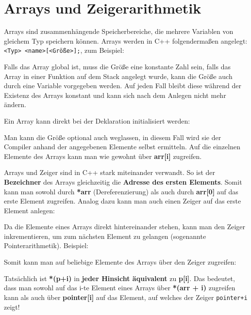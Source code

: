 \section{\ExercisePrefixMemory Arrays und Zeigerarithmetik}
Arrays sind zusammenhängende Speicherbereiche, die mehrere Variablen von gleichem Typ speichern können.
Arrays werden in C++ folgendermaßen angelegt: \lstinline{<Typ> <name>[<Größe>];}, zum Beispiel:



Falls das Array global ist, muss die Größe eine konstante Zahl sein, falls das Array in einer Funktion auf dem Stack angelegt wurde, kann die Größe auch durch eine Variable vorgegeben werden.
Auf jeden Fall bleibt diese während der Existenz des Arrays konstant und kann sich nach dem Anlegen nicht mehr ändern.

Ein Array kann direkt bei der Deklaration initialisiert werden:



Man kann die Größe optional auch weglassen, in diesem Fall wird sie der Compiler anhand der angegebenen Elemente selbst ermitteln. Auf die einzelnen Elemente des Arrays kann man wie gewohnt über \textbf{arr[i]} zugreifen.

Arrays und Zeiger sind in C++ stark miteinander verwandt.
So ist der \textbf{Bezeichner} des Arrays gleichzeitig die \textbf{Adresse des ersten Elements}.
Somit kann man sowohl durch \textbf{*arr} (Dereferenzierung) als auch durch \textbf{arr[0]} auf das erste Element zugreifen.
Analog dazu kann man auch einen Zeiger auf das erste Element anlegen:



Da die Elemente eines Arrays direkt hintereinander stehen, kann man den Zeiger inkrementieren, um zum  nächsten Element zu gelangen (sogenannte Pointerarithmetik).
Beispiel:



Somit kann man auf beliebige Elemente des Arrays über den Zeiger zugreifen:



Tatsächlich ist \textbf{*(p+i)} in \textbf{jeder Hinsicht äquivalent} zu \textbf{p[i]}.
Das bedeutet, dass man sowohl auf das i-te Element eines Arrays über \textbf{*(arr + i)} zugreifen kann als auch über \textbf{pointer[i]} auf das Element, auf welches der Zeiger \lstinline{pointer+i} zeigt!


